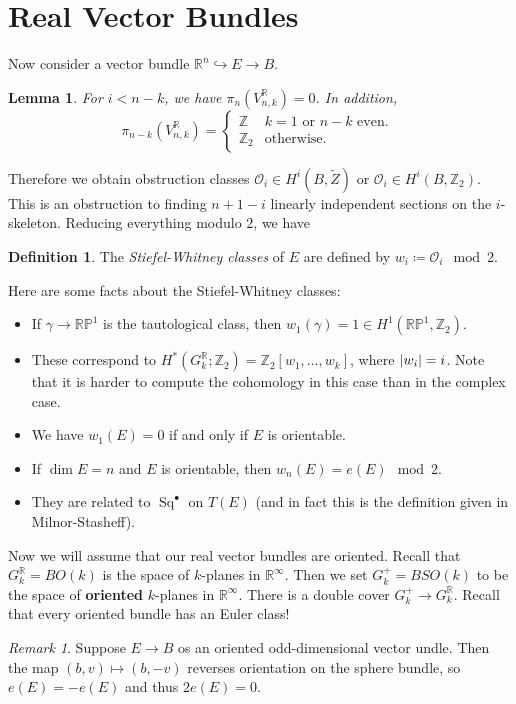 \documentclass[leqno, openany]{memoir}
\newtheorem{lem}[thm]{Lemma}
\theoremstyle{definition}
\newtheorem{defn}[thm]{Definition}
\theoremstyle{remark}
\newtheorem{rmk}[thm]{Remark}
\theoremstyle{plain}
\theoremstyle{definition}
\theoremstyle{remark}
\newcommand{\R}{\mathbb{R}}
\newcommand{\Z}{\mathbb{Z}}
\renewcommand{\P}{\mathbb{P}}
\newcommand{\mc}[1]{\mathcal{#1}}
\newcommand{\wt}[1]{\widetilde{#1}}
\DeclareMathOperator{\Sq}{Sq}
\begin{document}
\section{Real Vector Bundles}%
\label{sec:real_vector_bundles}

Now consider a vector bundle $\R^n \hookrightarrow E \to B$.

\begin{lem}
    For $i < n-k$, we have $\pi_n(V_{n,k}^{\R}) = 0$. In addition, 
    \[ \pi_{n-k}(V_{n,k}^{\R}) = \begin{cases}
        \Z & k=1 \text{ or } n-k \text{ even. } \\
        \Z_2 & \text{otherwise}.
    \end{cases} \]
\end{lem}
Therefore we obtain obstruction classes $\mc{O}_i \in H^i(B, \wt{Z})$ or $\mc{O}_i \in H^i(B, \Z_2)$. This is an obstruction to finding $n+1-i$ linearly independent sections on the $i$-skeleton. Reducing everything modulo $2$, we have
\begin{defn}
    The \textit{Stiefel-Whitney classes} of $E$ are defined by $w_i \coloneqq \mc{O}_i \mod 2$.
\end{defn}
Here are some facts about the Stiefel-Whitney classes:
\begin{itemize}
    \item If $\gamma \to \R\P^1$ is the tautological class, then $w_1(\gamma) = 1 \in H^1(\R\P^1, \Z_2)$.
    \item These correspond to $H^*(G_k^{\R}; \Z_2) = \Z_2[w_1, \ldots, w_k]$, where $\abs{w_i} = i$. Note that it is harder to compute the cohomology in this case than in the complex case.
    \item We have $w_1(E) = 0$ if and only if $E$ is orientable.
    \item If $\dim E = n$ and $E$ is orientable, then $w_n(E) = e(E) \mod 2$.
    \item They are related to $\Sq^{\bullet}$ on $T(E)$ (and in fact this is the definition given in Milnor-Stasheff).
\end{itemize}

Now we will assume that our real vector bundles are oriented. Recall that $G_k^{\R} = BO(k)$ is the space of $k$-planes in $\R^{\infty}$. Then we set $G_k^+ = BSO(k)$ to be the space of \textbf{oriented} $k$-planes in $\R^{\infty}$. There is a double cover $G_k^+ \to G_k^{\R}$. Recall that every oriented bundle has an Euler class!
\begin{rmk}
    Suppose $E \to B$ os an oriented odd-dimensional vector undle. Then the map $(b, v) \mapsto (b,-v)$ reverses orientation on the sphere bundle, so $e(E) = -e(E)$ and thus $2e(E) = 0$.
\end{rmk}
\end{document}

